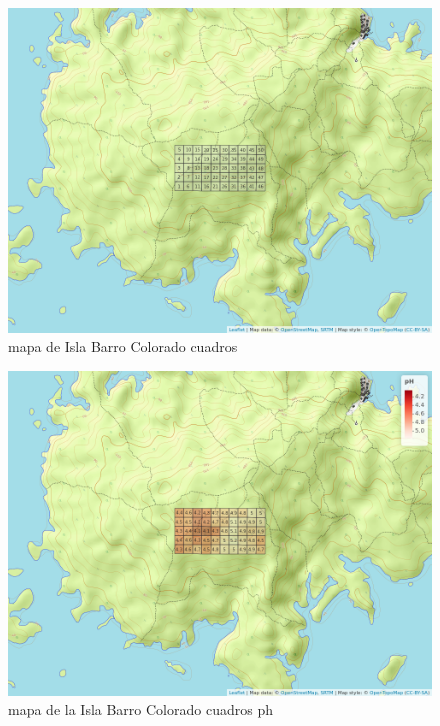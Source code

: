 \documentclass[11pt,]{article}
\begin{document}
\begin{figure}
\centering
\includegraphics[width=1.00000\textwidth]{mapa_cuadros.png}
\caption{mapa de Isla Barro Colorado cuadros\label{fig:bci_map}}
\end{figure}

\begin{figure}
\centering
\includegraphics[width=1.00000\textwidth]{mapa_cuadros_ph.png}
\caption{mapa de la Isla Barro Colorado cuadros ph\label{fig:bci_map}}
\end{figure}
\end{document}
